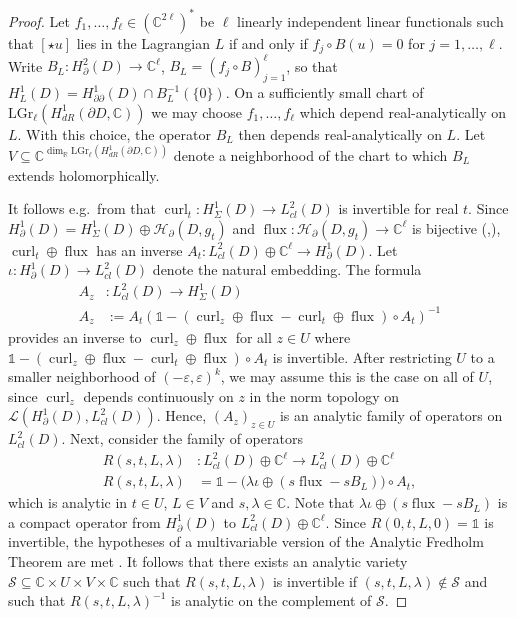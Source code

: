 \documentclass[11pt,reqno]{amsart}
\DeclareMathOperator{\curl}{curl}
\DeclareMathOperator{\flux}{flux}
\begin{document}
\begin{proof}
     Let $f_1,\ldots,f_\ell \in (\mathbb C^{2\ell})^\ast$ be $\ell$ linearly independent linear functionals such that $[\star u]$ lies in the Lagrangian $L$ if and only if $f_j \circ B(u) = 0$ for $j=1,\ldots,\ell$. Write $B_L: H^2_{\partial}(D) \to \mathbb C^\ell$, $B_L = \left(f_j \circ B\right)_{j=1}^\ell$, so that $H^1_L(D) = H^1_{\partial\partial}(D) \cap B_L^{-1}(\{0\})$. On a sufficiently small chart of $\mathrm{LGr}_\ell(H^1_{dR}(\partial D,\mathbb C))$ we may choose $f_1,\ldots,f_\ell$ which depend real-analytically on $L$. With this choice, the operator $B_L$ then depends real-analytically on $L$. Let $V \subseteq \mathbb C^{\dim_{\mathbb R} \mathrm{LGr}_\ell(H^1_{dR}(\partial D,\mathbb C))}$ denote a neighborhood of the chart to which $B_L$ extends holomorphically.
    
    It follows e.g.\ from \cite[Theorem 1.1]{EncisoGarciaPeralta2018} that $\curl_t: H^1_{\Sigma}(D) \to L^2_{cl}(D)$ is invertible for real $t$. Since $H^1_{\partial}(D) = H^1_{\Sigma}(D) \oplus \mathcal H_{\partial}(D,g_t)$ and $\flux: \mathcal H_{\partial}(D,g_t) \to \mathbb C^{\ell}$ is bijective (\cite[Corollary 2.6.2]{Schwarz1995},\cite[Theorem 1]{CantarellaDeTurckGluck2002topology}), $\curl_t \oplus \flux$ has an inverse $A_t: L^2_{cl}(D) \oplus \mathbb C^{\ell} \to H^1_\partial(D)$. Let $\iota: H^1_{\partial}(D) \to L^2_{cl}(D)$ denote the natural embedding. The formula 
    \begin{align*}
        A_z&: L^2_{cl}(D) \to H^1_{\Sigma}(D) \\
        A_z &:= A_t(\mathds{1} - (\curl_z \oplus \flux - \curl_t \oplus \flux) \circ A_t)^{-1}
    \end{align*}
    provides an inverse to $\curl_z \oplus \flux$ for all $z \in U$ where $\mathds{1} - (\curl_z \oplus \flux - \curl_t \oplus \flux) \circ A_t$ is invertible. After restricting $U$ to a smaller neighborhood of $(-\varepsilon,\varepsilon)^k$, we may assume this is the case on all of $U$, since $\curl_z$ depends continuously on $z$ in the norm topology on $\mathcal L(H^1_\partial(D),L^2_{cl}(D))$. Hence, $(A_z)_{z \in U}$ is an analytic family of operators on $L^2_{cl}(D)$.
    Next, consider the family of operators
    \begin{align*}
        R(s,t,L,\lambda)&: L^2_{cl}(D) \oplus \mathbb C^{\ell} \to L^2_{cl}(D) \oplus \mathbb C^{\ell} \\
        R(s,t,L,\lambda) &= \mathds{1} - \big( \lambda \iota \oplus (s \flux - s B_L) \big) \circ A_t,
    \end{align*}
    which is analytic in $t \in U$, $L \in V$ and $s, \lambda \in \mathbb C$. Note that $\lambda \iota \oplus (s \flux - s B_L)$ is a compact operator from $H^1_\partial(D)$ to $L^2_{cl}(D) \oplus \mathbb C^\ell$. Since $R(0,t,L,0) = \mathds{1}$ is invertible, the hypotheses of a multivariable version of the Analytic Fredholm Theorem are met \cite[Theorem 3]{StessinYangZhu2011}. It follows that there exists an analytic variety $\mathcal S \subseteq \mathbb C \times U \times V \times \mathbb C$ such that $R(s,t,L,\lambda)$ is invertible if $(s,t,L,\lambda) \not\in \mathcal S$ and such that $R(s,t,L,\lambda)^{-1}$ is analytic on the complement of $\mathcal S$.
    

\end{proof}
\end{document}
